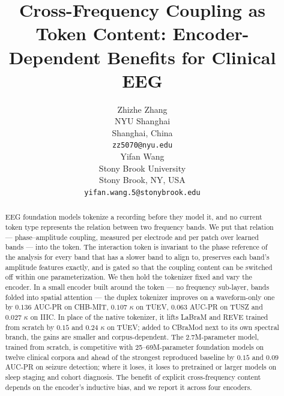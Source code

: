 \documentclass{article} %
\title{Cross-Frequency Coupling as Token Content: Encoder-Dependent Benefits for Clinical EEG}
\author{%
Zhizhe Zhang \\
NYU Shanghai \\
Shanghai, China \\
\texttt{zz5070@nyu.edu} \\
\And
Yifan Wang \\
Stony Brook University \\
Stony Brook, NY, USA \\
\texttt{yifan.wang.5@stonybrook.edu}
}
\begin{document}
\maketitle

\begin{abstract}
EEG foundation models tokenize a recording before they model it, and no
current token type represents the relation between two frequency bands.
We put that relation --- phase--amplitude coupling, measured per electrode
and per patch over learned bands --- into the token. The interaction token
is invariant to the phase reference of the analysis for every band that
has a slower band to align to, preserves each band's amplitude features
exactly, and is gated so that the coupling content can be switched off
within one parameterization. We then hold the tokenizer fixed and vary
the encoder. In a small encoder built around the token --- no frequency
sub-layer, bands folded into spatial attention --- the duplex tokenizer
improves on a waveform-only one by $0.136$ AUC-PR on CHB-MIT, $0.107$
$\kappa$ on TUEV, $0.063$ AUC-PR on TUSZ and $0.027$ $\kappa$ on IIIC. In place of the native
tokenizer, it lifts LaBraM and REVE trained from scratch by $0.15$ and
$0.24$ $\kappa$ on TUEV; added to CBraMod next to its own spectral branch,
the gains are smaller and corpus-dependent. The 2.7M-parameter model,
trained from scratch, is competitive with 25--69M-parameter foundation
models on twelve clinical corpora and ahead of the strongest reproduced
baseline by $0.15$ and $0.09$ AUC-PR on seizure detection; where it loses,
it loses to pretrained or larger models on sleep staging and cohort
diagnosis. The benefit of explicit cross-frequency content depends on the
encoder's inductive bias, and we report it across four encoders.
\end{abstract}













\appendix

\end{document}
